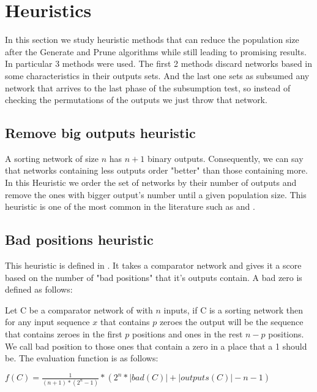\documentclass[../main.tex]{subfiles}
\begin{document}
	\section{Heuristics}
	In this section we study heuristic methods that can reduce the population size after the Generate and Prune algorithms while still leading to promising results. In particular 3 methods were used. The first 2 methods discard networks based in some characteristics in their outputs sets. And the last one sets as subsumed any network that arrives to the last phase of the subsumption test, so instead of checking the permutations of the outputs we just throw that network.
	
	\subsection{Remove big outputs heuristic}
	A sorting network of size $n$ has $n+1$ binary outputs. Consequently, we can say that networks containing less outputs order "better" than those containing more. In this Heuristic we order the set of networks by their number of outputs and remove the ones with bigger output's number until a given population size. This heuristic is one of the most common in the literature such as \cite{Sekanina2005} and \cite{SortingNetworkIsomorphism}.
	
	\subsection{Bad positions heuristic}
	This heuristic is defined in \cite{FRASINARU2019447}. It takes a comparator network and gives it a score based on the number of "bad positions" that it's outputs contain. A bad zero is defined as follows:
	
	Let C be a comparator network of with $n$ inputs, if C is a sorting network then for any input sequence $x$ that contains $p$ zeroes the output will be the sequence that contains zeroes in the first $p$ positions and ones in the rest $n-p$ positions. We call bad position to those ones that contain a zero in a place that a 1 should be. The evaluation function is as follows:
	
	$f(C)=\frac{1}{(n+1)*(2^n-1)}*(2^n * |bad(C)| + |outputs(C)| - n -1)$
	
\end{document}
